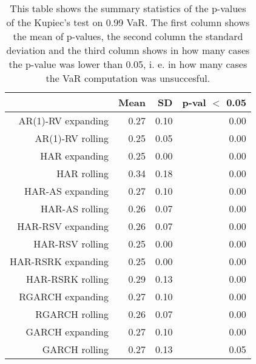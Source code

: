 \begin{table}[ht]
\centering
\begin{tabular}{rrrr}
  \hline
 & Mean & SD & p-val $<$ 0.05 \\ 
  \hline
AR(1)-RV expanding & 0.27 & 0.10 & 0.00 \\ 
  AR(1)-RV rolling & 0.25 & 0.05 & 0.00 \\ 
  HAR expanding & 0.25 & 0.00 & 0.00 \\ 
  HAR rolling & 0.34 & 0.18 & 0.00 \\ 
  HAR-AS expanding & 0.27 & 0.10 & 0.00 \\ 
  HAR-AS rolling & 0.26 & 0.07 & 0.00 \\ 
  HAR-RSV expanding & 0.26 & 0.07 & 0.00 \\ 
  HAR-RSV rolling & 0.25 & 0.00 & 0.00 \\ 
  HAR-RSRK expanding & 0.25 & 0.00 & 0.00 \\ 
  HAR-RSRK rolling & 0.29 & 0.13 & 0.00 \\ 
  RGARCH expanding & 0.27 & 0.10 & 0.00 \\ 
  RGARCH rolling & 0.26 & 0.07 & 0.00 \\ 
  GARCH expanding & 0.27 & 0.10 & 0.00 \\ 
  GARCH rolling & 0.27 & 0.13 & 0.05 \\ 
   \hline
\end{tabular}
\caption[Kupiec's test p-values summary, alpha =0.99]{This table shows the summary statistics of the p-values of the Kupiec's test on 0.99 VaR. 
            The first column shows the mean of p-values, the second column the standard deviation 
            and the third column shows in how many cases the p-value was lower than 0.05, i. e. in how many cases the VaR computation was unsuccesful.} 
\label{Table:Kupiec_test_summary_0.99}
\end{table}
